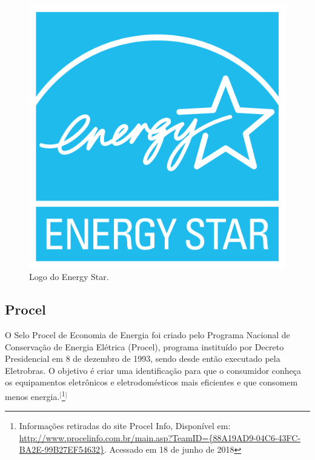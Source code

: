 \begin{figure}[htb]
	\caption{\label{fig:energy-star}Logo do Energy Star.}
	\begin{center}
	    \includegraphics[scale=0.08]{imagens/energy-star.png}
	\end{center}
\end{figure}

\subsection{Procel}

O Selo Procel de Economia de Energia foi criado pelo Programa Nacional de Conservação de Energia Elétrica (Procel), programa instituído por Decreto Presidencial em 8 de dezembro de 1993, sendo desde então executado pela Eletrobras. O objetivo é criar uma identificação para que o consumidor conheça os equipamentos eletrônicos e eletrodomésticos mais eficientes e que consomem menos energia.$^{[}$\footnote{Informações retiradas do site Procel Info, Disponível em: \url{http://www.procelinfo.com.br/main.asp?TeamID={88A19AD9-04C6-43FC-BA2E-99B27EF54632}}. Acessado em 18 de junho de 2018}$^{]}$

